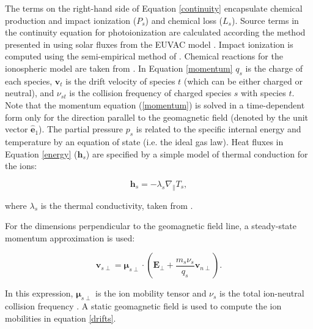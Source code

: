\documentclass[11pt,letterpaper]{article}
\begin{document}
The terms on the right-hand side of Equation \ref{continuity} encapsulate chemical production and impact ionization ($P_s$) and chemical loss ($L_s$). Source terms in the continuity equation for photoionization are calculated according the method presented in \citet{Solomon:2005} using solar fluxes from the EUVAC model \citep{Richards:1994}. Impact ionization is computed using the semi-empirical method of \citet[][and references therein]{Fang:2008}. Chemical reactions for the ionospheric model are taken from \citet[][and references therein]{Diloy:1996,StMaurice:1998}. In Equation \ref{momentum} $q_s$ is the charge of each species, $\mathbf{v}_t$ is the drift velocity of species $t$ (which can be either charged or neutral), and $\nu_{st}$ is the collision frequency of charged species $s$ with species $t$. Note that the momentum equation (\ref{momentum}) is solved in a time-dependent form only for the direction parallel to the geomagnetic field (denoted by the unit vector $\hat{\mathbf{e}}_1$). The partial pressure $p_s$ is related to the specific internal energy and temperature by an equation of state (i.e. the ideal gas law).  Heat fluxes in Equation \ref{energy} ($\mathbf{h}_s$) are specified by a simple model of thermal conduction for the ions:  
\begin{linenomath*} \begin{equation}
\mathbf{h}_s = - \lambda_s \nabla_{\parallel} T_s,
\end{equation} \end{linenomath*}
where $\lambda_s$ is the thermal conductivity, taken from \citet{Schunk:1974}. %

For the dimensions perpendicular to the geomagnetic field line, a steady-state momentum approximation is used:
\begin{linenomath*} \begin{equation}
\mathbf{v}_{s \perp} = \boldsymbol{\mu}_{s \perp} \cdot \left( \mathbf{E}_\perp + \frac{m_s \nu_s}{q_s} \mathbf{v}_{n\perp} \right). \label{drifts}
\end{equation} \end{linenomath*}
In this expression, $\boldsymbol{\mu}_{s\perp}$ is the ion mobility tensor and $\nu_s$ is the total ion-neutral collision frequency \citep{Zettergren:2012}. A static geomagnetic field is used to compute the ion mobilities in equation \ref{drifts}. %
\end{document}
